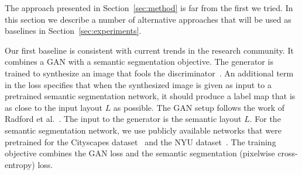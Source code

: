 The approach presented in Section~\ref{sec:method} is far from the first we tried. In this section we describe a number of alternative approaches that will be used as baselines in Section~\ref{sec:experiments}.

Our first baseline is consistent with current trends in the research community. It combines a GAN with a semantic segmentation objective. The generator is trained to synthesize an image that fools the discriminator~\cite{Goodfellow2014}. An additional term in the loss specifies that when the synthesized image is given as input to a pretrained semantic segmentation network, it should produce a label map that is as close to the input layout $L$ as possible. The GAN setup follows the work of Radford et al.~\cite{Radford2016}. The input to the generator is the semantic layout $L$. For the semantic segmentation network, we use publicly available networks that were pretrained for the Cityscapes dataset~\cite{YuKoltun2016} and the NYU dataset~\cite{Long2015}. The training objective combines the GAN loss and the semantic segmentation (pixelwise cross-entropy) loss.


